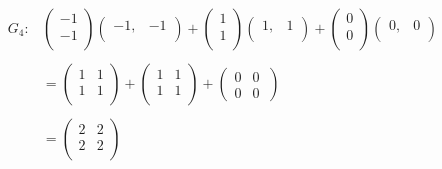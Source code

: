 \documentclass[11pt,a4paper]{article}
\theoremstyle{definition}
\begin{document}
\begin{align*}
G_4: & \begin{pmatrix}
-1\\ -1\\
\end{pmatrix}
\begin{pmatrix}
-1, & -1\\
\end{pmatrix} + \begin{pmatrix}
1\\ 1\\
\end{pmatrix}
\begin{pmatrix}
1, & 1\\
\end{pmatrix} + \begin{pmatrix}
0 \\ 0\\
\end{pmatrix}
\begin{pmatrix}
0, & 0\\
\end{pmatrix}\\\\
& = \begin{pmatrix}
1 & 1\\
1 & 1\\
\end{pmatrix} + \begin{pmatrix}
1 & 1\\
1 & 1\\
\end{pmatrix} + \begin{pmatrix}
0 & 0\\
0 & 0\
\end{pmatrix}\\\\
& = \begin{pmatrix}
2 & 2\\
2 & 2\\
\end{pmatrix}\\
\end{align*}
\end{document}
